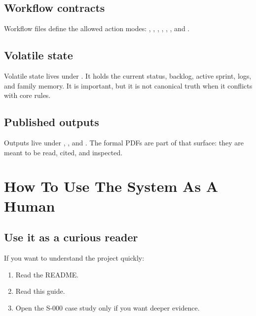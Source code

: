 \documentclass[a4paper,11pt,openany]{report}
\begin{document}
\section{Workflow contracts}

Workflow files define the allowed action modes:
, , , ,
, , and .

\section{Volatile state}

Volatile state lives under . It holds the current status,
backlog, active sprint, logs, and family memory. It is important, but it is not
canonical truth when it conflicts with core rules.

\section{Published outputs}

Outputs live under , , and
. The formal PDFs are part of that surface: they are meant to be
read, cited, and inspected.


\chapter{How To Use The System As A Human}


\section{Use it as a curious reader}

If you want to understand the project quickly:

\begin{enumerate}
  \item Read the README.
  \item Read this guide.
  \item Open the S-000 case study only if you want deeper evidence.
\end{enumerate}
\end{document}
